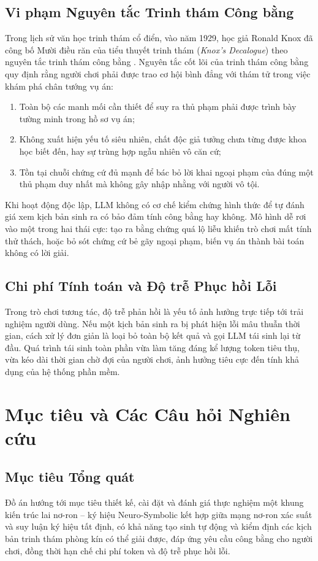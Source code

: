 \subsection{Vi phạm Nguyên tắc Trinh thám Công bằng}
Trong lịch sử văn học trinh thám cổ điển, vào năm 1929, học giả Ronald Knox đã công bố Mười điều răn của tiểu thuyết trinh thám (\textit{Knox's Decalogue}) theo nguyên tắc trinh thám công bằng \cite{knox1929ten}. Nguyên tắc cốt lõi của trinh thám công bằng quy định rằng người chơi phải được trao cơ hội bình đẳng với thám tử trong việc khám phá chân tướng vụ án:
\begin{enumerate}[label=(\roman*)]
    \item Toàn bộ các manh mối cần thiết để suy ra thủ phạm phải được trình bày tường minh trong hồ sơ vụ án;
    \item Không xuất hiện yếu tố siêu nhiên, chất độc giả tưởng chưa từng được khoa học biết đến, hay sự trùng hợp ngẫu nhiên vô căn cứ;
    \item Tồn tại chuỗi chứng cứ đủ mạnh để bác bỏ lời khai ngoại phạm của đúng một thủ phạm duy nhất mà không gây nhập nhằng với người vô tội.
\end{enumerate}

Khi hoạt động độc lập, LLM không có cơ chế kiểm chứng hình thức để tự đánh giá xem kịch bản sinh ra có bảo đảm tính công bằng hay không. Mô hình dễ rơi vào một trong hai thái cực: tạo ra bằng chứng quá lộ liễu khiến trò chơi mất tính thử thách, hoặc bỏ sót chứng cứ bẻ gãy ngoại phạm, biến vụ án thành bài toán không có lời giải.

\subsection{Chi phí Tính toán và Độ trễ Phục hồi Lỗi}
Trong trò chơi tương tác, độ trễ phản hồi là yếu tố ảnh hưởng trực tiếp tới trải nghiệm người dùng. Nếu một kịch bản sinh ra bị phát hiện lỗi mâu thuẫn thời gian, cách xử lý đơn giản là loại bỏ toàn bộ kết quả và gọi LLM tái sinh lại từ đầu. Quá trình tái sinh toàn phần vừa làm tăng đáng kể lượng token tiêu thụ, vừa kéo dài thời gian chờ đợi của người chơi, ảnh hưởng tiêu cực đến tính khả dụng của hệ thống phần mềm.

\section{Mục tiêu và Các Câu hỏi Nghiên cứu}
\label{sec:intro_objectives}

\subsection{Mục tiêu Tổng quát}
Đồ án hướng tới mục tiêu thiết kế, cài đặt và đánh giá thực nghiệm một khung kiến trúc lai nơ-ron -- ký hiệu Neuro-Symbolic kết hợp giữa mạng nơ-ron xác suất và suy luận ký hiệu tất định, có khả năng tạo sinh tự động và kiểm định các kịch bản trinh thám phòng kín có thể giải được, đáp ứng yêu cầu công bằng cho người chơi, đồng thời hạn chế chi phí token và độ trễ phục hồi lỗi.

